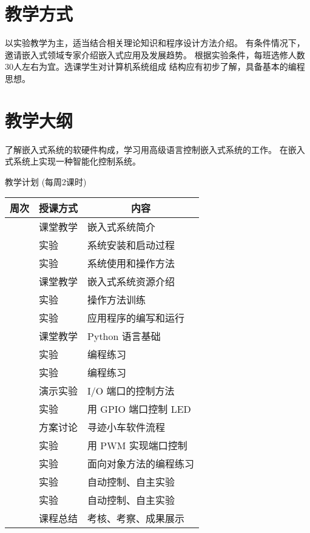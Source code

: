 \documentclass{article}
\begin{document}
\section{教学方式}

以实验教学为主，适当结合相关理论知识和程序设计方法介绍。
有条件情况下，邀请嵌入式领域专家介绍嵌入式应用及发展趋势。
根据实验条件，每班选修人数 30人左右为宜。选课学生对计算机系统组成
结构应有初步了解，具备基本的编程思想。

\section{教学大纲}
    了解嵌入式系统的软硬件构成，学习用高级语言控制嵌入式系统的工作。
    在嵌入式系统上实现一种智能化控制系统。

\begin{center}
    \large
    教学计划 (每周2课时)

    \newcommand{\week}{\addtocounter{weeks}{1}\arabic{weeks}}
    \begin{tabular}{|c|l|l|} \hline
        周次 & 授课方式 &  \multicolumn{1}{c|}{内容} \\ \hline
        \week& 课堂教学 &  嵌入式系统简介 \\
        \week& 实验     &  系统安装和启动过程 \\
        \week& 实验     &  系统使用和操作方法 \\
        \week& 课堂教学 &  嵌入式系统资源介绍 \\
        \week& 实验     &  操作方法训练 \\
        \week& 实验     &  应用程序的编写和运行 \\
        \week& 课堂教学 &  Python 语言基础 \\
        \week& 实验     &  编程练习 \\
        \week& 实验     &  编程练习 \\
        \week& 演示实验 &  I/O 端口的控制方法 \\
        \week& 实验     &  用 GPIO 端口控制 LED \\
        \week& 方案讨论 &  寻迹小车软件流程 \\
        \week& 实验     &  用 PWM 实现端口控制 \\
        \week& 实验     &  面向对象方法的编程练习 \\
        \week& 实验     &  自动控制、自主实验 \\
        \week& 实验     &  自动控制、自主实验 \\
        \week& 课程总结 &  考核、考察、成果展示 \\
        \hline
    \end{tabular}
\end{center}
\end{document}

